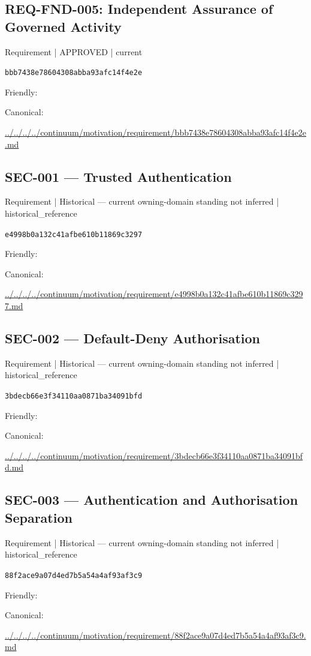 \documentclass[10pt,a4paper]{article}
\begin{document}
\subsection*{REQ-FND-005: Independent Assurance of Governed Activity}
{\small Requirement | APPROVED | current}\par
\texttt{bbb7438e78604308abba93afc14f4e2e}\par
Friendly: \par
Canonical: \par
{\footnotesize\url{../../../../continuum/motivation/requirement/bbb7438e78604308abba93afc14f4e2e.md}}\par
\subsection*{SEC-001 — Trusted Authentication}
{\small Requirement | Historical — current owning-domain standing not inferred | historical\_reference}\par
\texttt{e4998b0a132c41afbe610b11869c3297}\par
Friendly: \par
Canonical: \par
{\footnotesize\url{../../../../continuum/motivation/requirement/e4998b0a132c41afbe610b11869c3297.md}}\par
\subsection*{SEC-002 — Default-Deny Authorisation}
{\small Requirement | Historical — current owning-domain standing not inferred | historical\_reference}\par
\texttt{3bdecb66e3f34110aa0871ba34091bfd}\par
Friendly: \par
Canonical: \par
{\footnotesize\url{../../../../continuum/motivation/requirement/3bdecb66e3f34110aa0871ba34091bfd.md}}\par
\subsection*{SEC-003 — Authentication and Authorisation Separation}
{\small Requirement | Historical — current owning-domain standing not inferred | historical\_reference}\par
\texttt{88f2ace9a07d4ed7b5a54a4af93af3c9}\par
Friendly: \par
Canonical: \par
{\footnotesize\url{../../../../continuum/motivation/requirement/88f2ace9a07d4ed7b5a54a4af93af3c9.md}}\par
\end{document}
